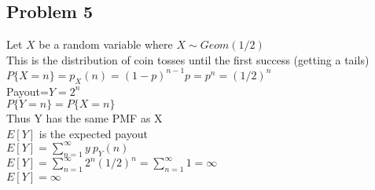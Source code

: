 \documentclass{article}
\begin{document}
\begin{flushleft}
\section*{Problem 5}
Let $X$ be a random variable where $X \sim Geom(1/2)$\\
This is the distribution of coin tosses until the first success (getting a tails)\\
$P\{X=n\}=p_X(n)=(1-p)^{n-1}p=p^n=(1/2)^n$\\
Payout=$Y=2^n$\\
$P\{Y=n\}=P\{X=n\}$\\
Thus Y has the same PMF as X\\
$E[Y]$ is the expected payout\\
$E[Y]=\sum_{n=1}^{\infty}y \ p_Y(n)$ \\ $E[Y]=\sum_{n=1}^{\infty}2^n(1/2)^n=\sum_{n=1}^{\infty}1
=\infty$\\
$E[Y]=\infty$\\
\pagebreak

\end{flushleft}
\end{document}

